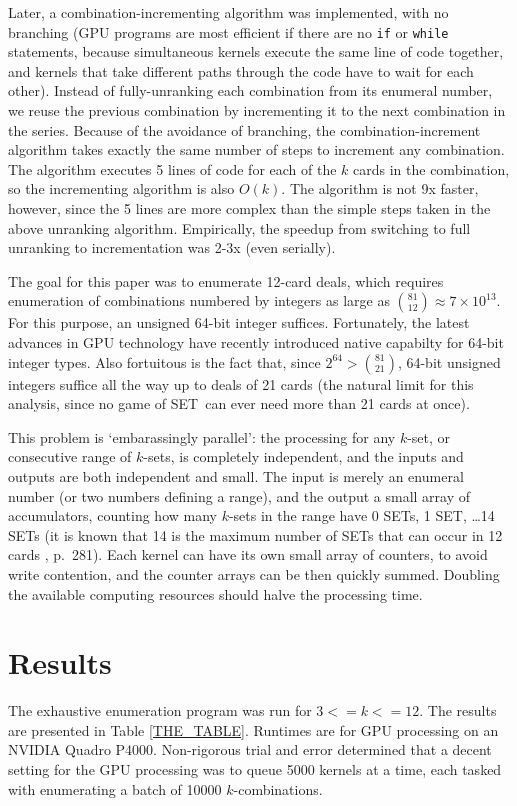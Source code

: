 \documentclass[10pt]{amsart}
\newcommand{\SETb}{SET\texttrademark\ } %
\begin{document}
Later, a combination-incrementing algorithm was implemented, with no branching
(GPU programs are most efficient if there are no {\tt if} or {\tt while}
statements, because simultaneous kernels execute the same line of code together,
and kernels that take different paths through the code have to wait for each
other). Instead of fully-unranking each combination from its enumeral number, we
reuse the previous combination by incrementing it to the next combination in the
series. Because of the avoidance of branching, the combination-increment
algorithm takes exactly the same number of steps to increment any
combination. The algorithm executes 5 lines of code for each of the $k$ cards in
the combination, so the incrementing algorithm is also $O(k)$. The algorithm is
not 9x faster, however, since the 5 lines are more complex than the simple steps
taken in the above unranking algorithm. Empirically, the speedup from switching
to full unranking to incrementation was 2-3x (even serially).

The goal for this paper was to enumerate 12-card deals, which requires
enumeration of combinations numbered by integers as large as $\binom{81}{12}
\approx 7\times 10^{13}$. For this purpose, an unsigned 64-bit integer
suffices. Fortunately, the latest advances in GPU technology have recently
introduced native capabilty for 64-bit integer types. Also fortuitous is the
fact that, since $2^{64} > \binom{81}{21}$, 64-bit unsigned integers suffice all
the way up to deals of 21 cards (the natural limit for this analysis, since no
game of \SETb can ever need more than 21 cards at once).

This problem is `embarassingly parallel': the processing for any $k$-set, or
consecutive range of $k$-sets, is completely independent, and the inputs and
outputs are both independent and small. The input is merely an enumeral number
(or two numbers defining a range), and the output a small array of accumulators,
counting how many $k$-sets in the range have 0 SETs, 1 SET, \ldots 14 SETs (it
is known that 14 is the maximum number of SETs that can occur in 12 cards
\cite{VINCI}, \cite{JOS} p.~281). Each kernel can have its own small array of
counters, to avoid write contention, and the counter arrays can be then quickly
summed. Doubling the available computing resources should halve the processing
time.

\section{Results}
The exhaustive enumeration program was run for $3<=k<=12$. The results are
presented in Table \ref{THE_TABLE}. Runtimes are for GPU processing on an
NVIDIA Quadro P4000. Non-rigorous trial and error determined that a decent
setting for the GPU processing was to queue 5000 kernels at a time, each tasked
with enumerating a batch of 10000 $k$-combinations.
\end{document}
